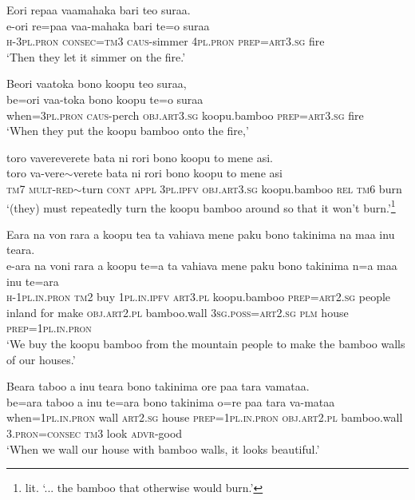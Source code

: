 \ea\label{ex:text6-36}
Eori repaa vaamahaka bari teo suraa.\\
\gll e-ori	re=paa	vaa-mahaka	bari	te=o	suraa\\
     \textsc{h}-3\textsc{pl}.\textsc{pron}	\textsc{consec}=\textsc{tm}3	\textsc{caus}-simmer	4\textsc{pl}.\textsc{pron}	\textsc{prep}=\textsc{art}3.\textsc{sg}	fire\\
\glt `Then they let it simmer on the fire.'
\z

\ea\label{ex:text6-37}
Beori vaatoka bono koopu teo suraa,\\
\gll be=ori	vaa-toka	bono	koopu	te=o	suraa\\
     when=3\textsc{pl}.\textsc{pron}	\textsc{caus}-perch	\textsc{obj}.\textsc{art}3.\textsc{sg}	koopu.bamboo	\textsc{prep}=\textsc{art}3.\textsc{sg}	fire\\
\glt `When they put the koopu bamboo onto the fire,'
\z

\ea\label{ex:text6-38}
toro vavereverete bata ni rori bono koopu to mene asi.\\
\gll toro	va-vere{$\sim$}verete	bata	ni	rori	bono	koopu	to	mene	asi\\
     \textsc{tm}7	\textsc{mult}-\textsc{red}{$\sim$}turn	\textsc{cont}	\textsc{appl}	3\textsc{pl}.\textsc{ipfv}	\textsc{obj}.\textsc{art}3.\textsc{sg}	koopu.bamboo	\textsc{rel}	\textsc{tm}6	burn\\
\glt `(they) must repeatedly turn the koopu bamboo around so that it won't burn.'\footnote{lit. `... the bamboo that otherwise would burn.'}
\z

\newpage
\ea\label{ex:text6-39}
Eara na von rara a koopu tea ta vahiava mene paku bono takinima na maa inu teara.\\
\gll e-ara	na	voni	rara	a	koopu	te=a	ta	vahiava	mene	paku	bono	takinima	n=a	maa	inu	te=ara\\
     \textsc{h}-1\textsc{pl}.\textsc{in}.\textsc{pron}	\textsc{tm}2	buy	1\textsc{pl}.\textsc{in}.\textsc{ipfv}	\textsc{art}3.\textsc{pl}	koopu.bamboo	\textsc{prep}=\textsc{art}2.\textsc{sg}	people	inland	for	make	\textsc{obj}.\textsc{art}2.\textsc{pl}	bamboo.wall	3\textsc{sg}.\textsc{poss}=\textsc{art}2.\textsc{sg}	\textsc{plm}	house	\textsc{prep}=1\textsc{pl}.\textsc{in}.\textsc{pron}\\
\glt `We buy the koopu bamboo from the mountain people to make the bamboo walls of our houses.'
\z

\ea\label{ex:text6-40}
Beara taboo a inu teara bono takinima ore paa tara vamataa.\\
\gll be=ara	taboo	a	inu	te=ara	bono	takinima	o=re	paa	tara	va-mataa\\
     when=1\textsc{pl}.\textsc{in}.\textsc{pron}	wall	\textsc{art}2.\textsc{sg}	house	\textsc{prep}=1\textsc{pl}.\textsc{in}.\textsc{pron}	\textsc{obj}.\textsc{art}2.\textsc{pl}	bamboo.wall	3.\textsc{pron}=\textsc{consec}	\textsc{tm}3	look	\textsc{advr}-good\\
\glt `When we wall our house with bamboo walls,  it looks beautiful.'
\z
